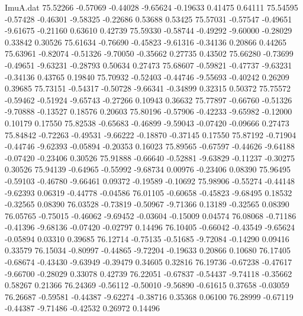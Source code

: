 \begin{filecontents}{ImuA.dat}
  75.52266   -0.57069   -0.44028   -9.65624   -0.19633    0.41475    0.64111
  75.54595   -0.57428   -0.46301   -9.58325   -0.22686    0.53688    0.53425
  75.57031   -0.57547   -0.49651   -9.61675   -0.21160    0.63610    0.42739
  75.59330   -0.58744   -0.49292   -9.60000   -0.28029    0.33842    0.30526
  75.61634   -0.76690   -0.45823   -9.61316   -0.34136    0.20866    0.44265
  75.63961   -0.82074   -0.51326   -9.70050   -0.35662    0.27735    0.43502
  75.66280   -0.73699   -0.49651   -9.63231   -0.28793    0.50634    0.27473
  75.68607   -0.59821   -0.47737   -9.63231   -0.34136    0.43765    0.19840
  75.70932   -0.52403   -0.44746   -9.55693   -0.40242    0.26209    0.39685
  75.73151   -0.54317   -0.50728   -9.66341   -0.34899    0.32315    0.50372
  75.75572   -0.59462   -0.51924   -9.65743   -0.27266    0.10943    0.36632
  75.77897   -0.66760   -0.51326   -9.70888   -0.13527    0.18576    0.20603
  75.80196   -0.57906   -0.42233   -9.65982   -0.12000    0.10179    0.17550
  75.82538   -0.65683   -0.46899   -9.59043   -0.07420   -0.09666    0.27473
  75.84842   -0.72263   -0.49531   -9.66222   -0.18870   -0.37145    0.17550
  75.87192   -0.71904   -0.44746   -9.62393   -0.05894   -0.20353    0.16023
  75.89565   -0.67597   -0.44626   -9.64188   -0.07420   -0.23406    0.30526
  75.91888   -0.66640   -0.52881   -9.63829   -0.11237   -0.30275    0.30526
  75.94139   -0.64965   -0.55992   -9.68734    0.00976   -0.23406    0.08390
  75.96495   -0.59103   -0.46780   -9.66461    0.09372   -0.19589   -0.10692
  75.98906   -0.55274   -0.44148   -9.62393    0.06319   -0.44778   -0.04586
  76.01105   -0.60658   -0.45823   -9.68495    0.18532   -0.32565    0.08390
  76.03528   -0.73819   -0.50967   -9.71366    0.13189   -0.32565    0.08390
  76.05765   -0.75015   -0.46062   -9.69452   -0.03604   -0.15009    0.04574
  76.08068   -0.71186   -0.41396   -9.68136   -0.07420   -0.02797    0.14496
  76.10405   -0.66042   -0.43549   -9.65624   -0.05894    0.03310    0.39685
  76.12714   -0.75135   -0.51685   -9.72084   -0.14290    0.09416    0.33579
  76.15034   -0.80997   -0.44865   -9.72204   -0.19633    0.20866    0.10680
  76.17405   -0.68674   -0.43430   -9.63949   -0.39479    0.34605    0.32816
  76.19736   -0.67238   -0.47617   -9.66700   -0.28029    0.33078    0.42739
  76.22051   -0.67837   -0.54437   -9.74118   -0.35662    0.58267    0.21366
  76.24369   -0.56112   -0.50010   -9.56890   -0.61615    0.37658   -0.03059
  76.26687   -0.59581   -0.44387   -9.62274   -0.38716    0.35368    0.06100
  76.28999   -0.67119   -0.44387   -9.71486   -0.42532    0.26972    0.14496

\end{filecontents}
